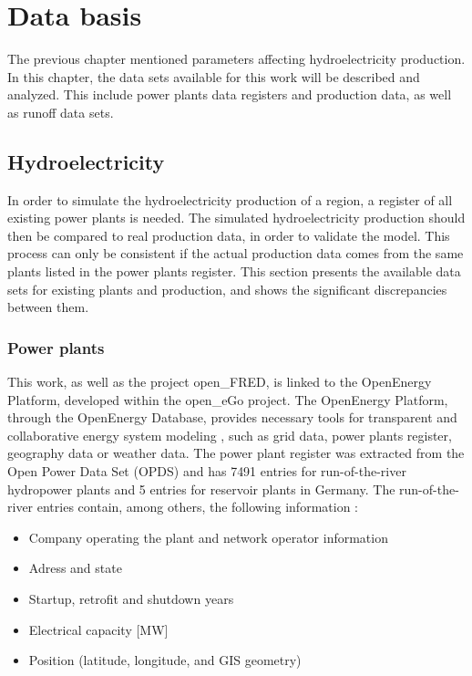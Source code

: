 \chapter{Data basis}
\label{chap:data_basis}

The previous chapter mentioned parameters affecting hydroelectricity production. In this chapter, the data sets available for this work will be described and analyzed. This include power plants data registers and production data, as well as runoff data sets. 

\section{Hydroelectricity}
\label{sec:db_hydroelec}
In order to simulate the hydroelectricity production of a region, a register of all existing power plants is needed. The simulated hydroelectricity production should then be compared to real production data, in order to validate the model. This process can only be consistent if the actual production data comes from the same plants listed in the power plants register. This section presents the available data sets for existing plants and production, and shows the significant discrepancies between them. 

\subsection{Power plants}
\label{sub:hpp_reg}
This work, as well as the project open\_FRED, is linked to the OpenEnergy Platform, developed within the open\_eGo project. The OpenEnergy Platform, through the OpenEnergy Database, provides necessary tools for transparent and collaborative energy system modeling \cite{oedb}, such as grid data, power plants register, geography data or weather data. The power plant register was extracted from the Open Power Data Set (OPDS) and has 7491 entries for run-of-the-river hydropower plants and 5 entries for reservoir plants in Germany. The run-of-the-river entries contain, among others, the following information :
\begin{itemize}
\itemsep-0.5em 
 \item Company operating the plant and network operator information
 \item Adress and state
 \item Startup, retrofit and shutdown years
 \item Electrical capacity [\unit{MW}]
 \item Position (latitude, longitude, and GIS geometry)
\end{itemize}

